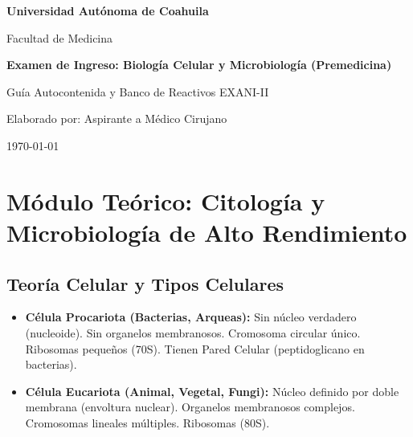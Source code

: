 \documentclass[spanish,letterpaper,oneside]{article}
\begin{document}
\begin{titlepage}
    \centering
    \vspace*{2cm}
    {\Huge \textbf{Universidad Autónoma de Coahuila} \par}
    \vspace{1cm}
    {\Large Facultad de Medicina \par}
    \vspace{2cm}
    {\LARGE \textbf{Examen de Ingreso: Biología Celular y Microbiología (Premedicina)} \par}
    \vspace{1cm}
    {\Large Guía Autocontenida y Banco de Reactivos EXANI-II \par}
    \vspace{3cm}
    {\large Elaborado por: Aspirante a Médico Cirujano \par}
    \vfill
    {\large \today \par}
\end{titlepage}

\tableofcontents
\newpage

\section{Módulo Teórico: Citología y Microbiología de Alto Rendimiento}
\subsection{Teoría Celular y Tipos Celulares}
\begin{itemize}
    \item \textbf{Célula Procariota (Bacterias, Arqueas):} Sin núcleo verdadero (nucleoide). Sin organelos membranosos. Cromosoma circular único. Ribosomas pequeños (70S). Tienen Pared Celular (peptidoglicano en bacterias).
    \item \textbf{Célula Eucariota (Animal, Vegetal, Fungi):} Núcleo definido por doble membrana (envoltura nuclear). Organelos membranosos complejos. Cromosomas lineales múltiples. Ribosomas (80S).
\end{itemize}
\end{document}
